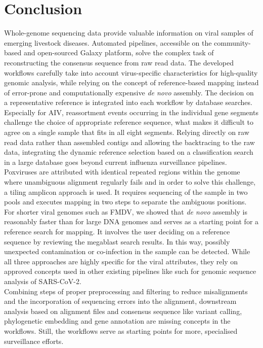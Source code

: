 \chapter{Conclusion}\label{chap:conclusion}
Whole-genome sequencing data provide valuable information on viral samples of emerging livestock diseases. Automated pipelines, accessible on the community-based and open-sourced Galaxy platform, solve the complex task of reconstructing the consensus sequence from raw read data. The developed workflows carefully take into account virus-specific characteristics for high-quality genomic analysis, while relying on the concept of reference-based mapping instead of error-prone and computationally expensive \textit{de novo} assembly. The decision on a representative reference is integrated into each workflow by database searches. Especially for \ac{AIV}, reassortment events occurring in the individual gene segments challenge the choice of appropriate reference sequence, what makes it difficult to agree on a single sample that fits in all eight segments. Relying directly on raw read data rather than assembled contigs and allowing the backtracing to the raw data, integrating the dynamic reference selection based on a classification search in a large database goes beyond current influenza surveillance pipelines.\\
Poxviruses are attributed with identical repeated regions within the genome where unambiguous alignment regularly fails and in order to solve this challenge, a tiling amplicon approach is used. It requires sequencing of the sample in two pools and executes mapping in two steps to separate the ambiguous positions.\\
For shorter viral genomes such as \ac{FMDV}, we showed that \textit{de novo} assembly is reasonably faster than for large \ac{DNA} genomes and serves as a starting point for a reference search for mapping. It involves the user deciding on a reference sequence by reviewing the megablast search results. In this way, possibly unexpected contamination or co-infection in the sample can be detected. While all three approaches are highly specific for the viral attributes, they rely on approved concepts used in other existing pipelines like such for genomic sequence analysis of \ac{SARS-CoV-2}.\\
Combining steps of proper preprocessing and filtering to reduce misalignments and the incorporation of sequencing errors into the alignment, downstream analysis based on alignment files and consensus sequence like variant calling, phylogenetic embedding and gene annotation are missing concepts in the workflows. Still, the workflows serve as starting points for more, specialised surveillance efforts.
